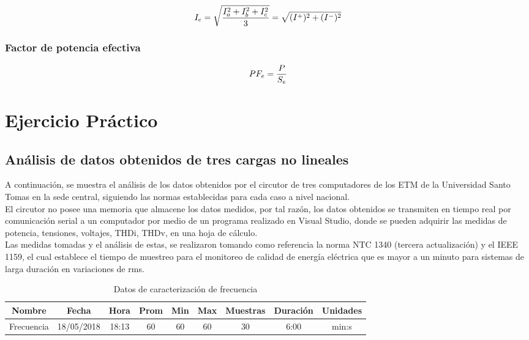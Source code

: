 \begin{equation}\label{EQ57}
I_{e}=\sqrt{\frac{I^2_{a}+I^2_{b}+I^2_{c}}{3}}=\sqrt{(I^+)^2+(I^-)^2}\\
\end{equation}

\subsubsection{Factor de potencia efectiva}

\begin{equation}\label{EQ58}
PF_{e}=\frac{P}{S_{e}}\\
\end{equation}

\section{Ejercicio Práctico}

\subsection{Análisis de datos obtenidos de tres cargas no lineales}

A continuación, se muestra el análisis de los datos obtenidos por el circutor de tres computadores de los ETM de la Universidad Santo Tomas en la sede central, siguiendo las normas establecidas para cada caso a nivel nacional. \\
El circutor no posee una memoria que almacene los datos medidos, por tal razón, los datos obtenidos se transmiten en tiempo real por comunicación serial a un computador por medio de un programa realizado en Visual Studio, donde se pueden adquirir las medidas de potencia, tensiones, voltajes, THDi, THDv, en una hoja de cálculo.\\
Las medidas tomadas y el análisis de estas, se realizaron tomando como referencia la norma NTC 1340 (tercera actualización) y el IEEE 1159, el cual establece el tiempo de muestreo para el monitoreo de calidad de energía eléctrica que es mayor a un minuto para sistemas de larga duración en variaciones de rms.

\begin{table}
\begin{center}
\begin{tabular}{ |c|c|c|c|c|c|c|c|c| } 
\hline
Nombre & Fecha & Hora & Prom & Min & Max & Muestras & Duración & Unidades\\
\hline
Frecuencia & 18/05/2018 & 18:13 & 60 & 60 & 60 & 30 & 6:00 & min:s\\
\hline
\end{tabular}
\end{center}
\caption{Datos de caracterización de frecuencia}
\label{tab:ejercicio-frecuencia}
\end{table}



